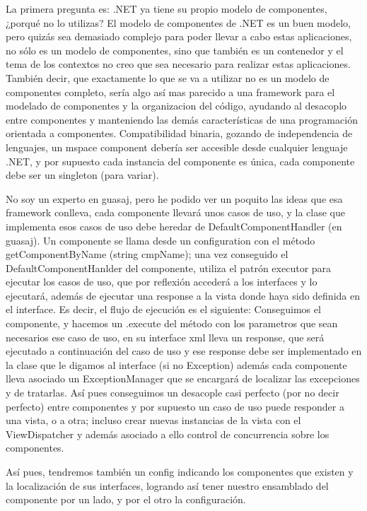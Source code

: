 \documentclass[a4paper]{article}
\begin{document}
La primera pregunta es: .NET ya tiene su propio modelo de componentes, ¿porqué
no lo utilizas?  El modelo de componentes de .NET es un buen modelo, pero quizás
sea demasiado complejo para poder llevar a cabo estas aplicaciones, no sólo es
un modelo de componentes, sino que también es un contenedor y el tema de los
contextos no creo que sea necesario para realizar estas aplicaciones. También
decir, que exactamente lo que se va a utilizar no es un modelo de componentes
completo, sería algo así mas parecido a una framework para el modelado de
componentes y la organizacion del código, ayudando al desacoplo entre
componentes y manteniendo las demás características de una programación
orientada a componentes.  Compatibilidad binaria, gozando de independencia de
lenguajes, un mspace component debería ser accesible desde cualquier lenguaje
.NET, y por supuesto cada instancia del componente es única, cada componente
debe ser un singleton (para variar).

No soy un experto en guasaj, pero he podido ver un poquito las ideas que esa
framework conlleva, cada componente llevará unos casos de uso, y la clase que
implementa esos casos de uso debe heredar de DefaultComponentHandler (en
guasaj).  Un componente se llama desde un configuration con el método
getComponentByName (string cmpName); una vez conseguido el
DefaultComponentHanlder del componente, utiliza el patrón executor para ejecutar
los casos de uso, que por reflexión accederá a los interfaces y lo ejecutará,
además de ejecutar una response a la vista donde haya sido definida en el
interface.  Es decir, el flujo de ejecución es el siguiente:  Conseguimos el
componente, y hacemos un .execute del método con los parametros que sean
necesarios ese caso de uso, en su interface xml lleva un response, que será
ejecutado a continuación del caso de uso y ese response debe ser implementado en
la clase que le digamos al interface (si no Exception)  además cada componente
lleva asociado un ExceptionManager que se encargará de localizar las
excepciones y de tratarlas.  Así pues conseguimos un desacople casi perfecto 
(por no decir perfecto) entre componentes y por supuesto un caso de uso puede
responder a una vista, o a otra; incluso crear nuevas instancias de la vista con
el ViewDispatcher y además asociado a ello control de concurrencia sobre los
componentes.

Así pues, tendremos también un config indicando los componentes que existen y la
localización de sus interfaces, logrando así tener nuestro ensamblado del
componente por un lado, y por el otro la configuración. 
\end{document}
